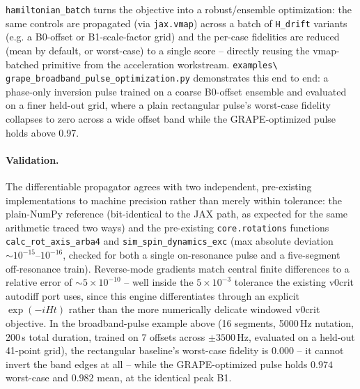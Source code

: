 \documentclass[11pt,oneside]{report}
\newcommand{\code}[1]{\texttt{#1}}
\begin{document}
\code{hamiltonian\_batch} turns the objective into a robust/ensemble
optimization: the same controls are propagated (via \code{jax.vmap}) across a
batch of \code{H\_drift} variants (e.g. a B0-offset or B1-scale-factor grid)
and the per-case fidelities are reduced (mean by default, or worst-case) to a
single score -- directly reusing the vmap-batched primitive from the
acceleration workstream. \code{examples\textbackslash
grape\_broadband\_pulse\_optimization.py} demonstrates this end to end: a
phase-only inversion pulse trained on a coarse B0-offset ensemble and
evaluated on a finer held-out grid, where a plain rectangular pulse's
worst-case fidelity collapses to zero across a wide offset band while the
GRAPE-optimized pulse holds above 0.97.

\paragraph{Validation.} The differentiable propagator agrees with two
independent, pre-existing implementations to machine precision rather than
merely within tolerance: the plain-NumPy reference (bit-identical to the JAX
path, as expected for the same arithmetic traced two ways) and the pre-existing
\code{core.rotations} functions \code{calc\_rot\_axis\_arba4} and
\code{sim\_spin\_dynamics\_exc} (max absolute deviation \(\sim
10^{-15}\)--\(10^{-16}\), checked for both a single on-resonance pulse and a
five-segment off-resonance train). Reverse-mode
gradients match central finite differences to a relative error of \(\sim
5\times 10^{-10}\) -- well inside the \(5\times 10^{-3}\) tolerance the
existing v0crit autodiff port uses, since this engine differentiates through
an explicit \(\exp(-iHt)\) rather than the more numerically delicate windowed
v0crit objective. In the broadband-pulse example above (16 segments,
5000\,Hz nutation, 200\,\textmu s total duration, trained on 7 offsets across
\(\pm 3500\)\,Hz, evaluated on a held-out 41-point grid), the rectangular
baseline's worst-case fidelity is \(0.000\) -- it cannot invert the band edges
at all -- while the GRAPE-optimized pulse holds \(0.974\) worst-case and
\(0.982\) mean, at the identical peak B1.
\end{document}

